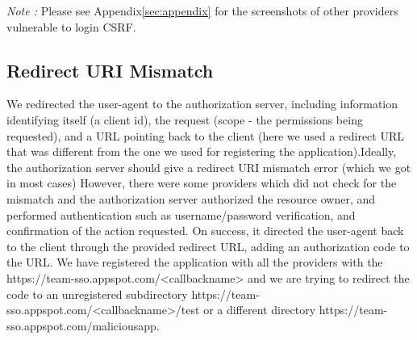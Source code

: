 \textit{Note :} Please see Appendix\ref{sec:appendix} for the screenshots of other providers vulnerable to login CSRF.

\subsection{Redirect URI Mismatch}
We redirected the user-agent to the authorization server, including information identifying itself (a client id), the request (scope - the permissions being requested), and a URL pointing back to the client (here we used a redirect URL that was different from the one we used for registering the application).Ideally, the authorization server should give a redirect URI mismatch error (which we got in most cases) However, there were some providers which did not check for the mismatch and the authorization server authorized the resource owner, and performed authentication such as username/password verification, and confirmation of the action requested. On success, it directed the user-agent back to the client through the provided redirect URL, adding an authorization code to the URL. 
We have registered the application with all the providers with the https://team-sso.appspot.com/<callbackname> and we are trying to redirect the code to an unregistered subdirectory https://team-sso.appspot.com/<callbackname>/test or a different directory https://team-sso.appspot.com/maliciousapp.

